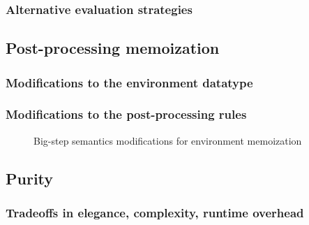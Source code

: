 
\subsubsection{Alternative evaluation strategies}
\label{sec:pattern_nomatch_strategies}


\subsection{Post-processing memoization}
\label{sec:memoization}

\subsubsection{Modifications to the environment datatype}
\label{sec:memoization-evalenv}

\subsubsection{Modifications to the post-processing rules}
\label{sec:memoization-postprocessing}

\begin{figure}
  \centering
  \begin{mdframed}
    \begin{singlespace}
      
    \end{singlespace}
  \end{mdframed}
  \caption{Big-step semantics modifications for environment memoization}
  \label{fig:big-step-memoization-rules}
\end{figure}

\subsection{Purity}
\label{sec:env-purity}


\subsubsection{Tradeoffs in elegance, complexity, runtime overhead}
\label{sec:elegance-and-complexity}

